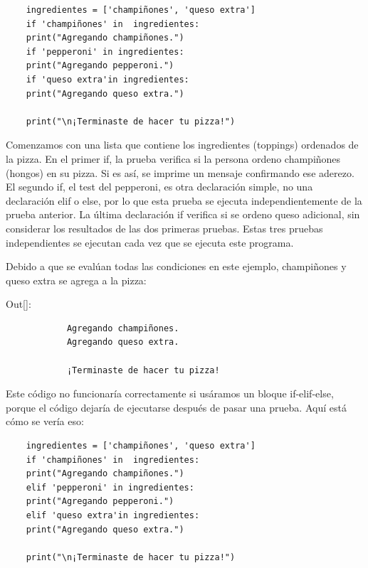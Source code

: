\hspace{-2.1cm}{\ttfamily \scriptsize  pizza.py}\vspace{-0.52cm} 
\begin{lstlisting}
	ingredientes = ['champiñones', 'queso extra']
	if 'champiñones' in  ingredientes:
	print("Agregando champiñones.")     
	if 'pepperoni' in ingredientes:
	print("Agregando pepperoni.")     
	if 'queso extra'in ingredientes:
	print("Agregando queso extra.")
	
	print("\n¡Terminaste de hacer tu pizza!")
\end{lstlisting}



Comenzamos con una lista que contiene los ingredientes (toppings) ordenados de la pizza. En el primer  {\ttfamily if},  la prueba verifica si la persona ordeno  champiñones (hongos) en su pizza. Si es así, se imprime un mensaje confirmando ese aderezo.   El segundo  {\ttfamily if}, el test del pepperoni, es otra declaración  simple, no una declaración  {\ttfamily elif}  o  {\ttfamily else}, por lo que  esta prueba se ejecuta independientemente de la prueba anterior. La última declaración  {\ttfamily if} verifica si se ordeno queso adicional, sin considerar   los resultados de las dos primeras pruebas.  Estas tres pruebas independientes se ejecutan cada vez que se ejecuta este programa. 

Debido a que se evalúan todas las condiciones en este ejemplo,  champiñones  y queso extra se agrega  a la pizza:\vspace{0.09cm}

{\ttfamily\scriptsize\noindent Out[]: \vspace{-0.3cm}	
	{\color{blue} 	
		\begin{verbatim}
			Agregando champiñones.
			Agregando queso extra.
			
			¡Terminaste de hacer tu pizza!
		\end{verbatim}
}} 

Este código no funcionaría correctamente si usáramos un bloque {\ttfamily if-elif-else},
porque el código dejaría de ejecutarse después de pasar una prueba. Aquí está
cómo se vería eso:

\hspace{-2.2cm}{\ttfamily \scriptsize  pizza.py}\vspace{-0.5cm}  
\begin{lstlisting}
	ingredientes = ['champiñones', 'queso extra'] 
	if 'champiñones' in  ingredientes:
	print("Agregando champiñones.")  
	elif 'pepperoni' in ingredientes:
	print("Agregando pepperoni.")  
	elif 'queso extra'in ingredientes:
	print("Agregando queso extra.")
	
	print("\n¡Terminaste de hacer tu pizza!")
\end{lstlisting}

